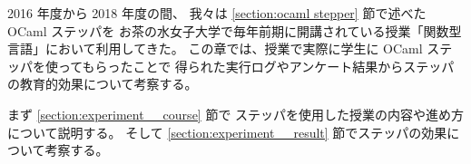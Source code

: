 
2016 年度から 2018 年度の間、
我々は \ref{section:ocaml stepper} 節で述べた OCaml ステッパを
お茶の水女子大学で毎年前期に開講されている授業「関数型言語」において利用してきた。
この章では、授業で実際に学生に OCaml ステッパを使ってもらったことで
得られた実行ログやアンケート結果からステッパの教育的効果について考察する。

まず \ref{section:experiment__course} 節で
ステッパを使用した授業の内容や進め方について説明する。
そして \ref{section:experiment__result} 節でステッパの効果について考察する。

